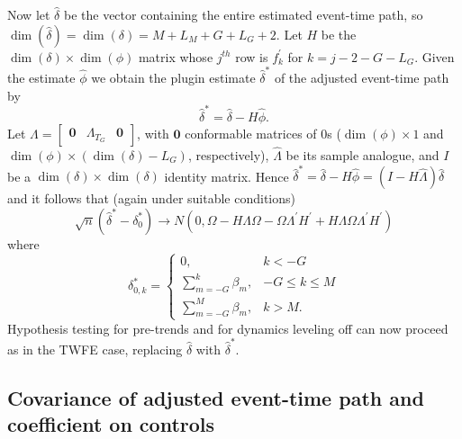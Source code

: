 \documentclass[bib]{./sty/statapress}
\begin{document}
Now let $\hat{\delta}$ be the vector containing the entire estimated
event-time path, so $\dim\left(\hat{\delta}\right)=\dim\left(\delta\right)=M+L_{M}+G+L_{G}+2$.
Let $H$ be the $\dim\left(\delta\right)\times\dim\left(\phi\right)$
matrix whose $j^{th}$ row is $f_{k}^{'}$ for $k=j-2-G-L_{G}$. Given
the estimate $\widehat{\phi}$ we obtain the plugin estimate $\hat{\delta}^{*}$
of the adjusted event-time path by
\[
\hat{\delta}^{*}=\widehat{\delta}-H\hat{\phi}.
\]
Let $\Lambda=\begin{bmatrix}\boldsymbol{0} & \Lambda_{T_G} & \boldsymbol{0}\end{bmatrix}$,
with $\boldsymbol{0}$ conformable matrices of 0s ($\dim\left(\phi\right)\times1$
and $\dim\left(\phi\right)\times\left(\dim\left(\delta\right)-L_{G}\right)$,
respectively), $\widehat{\Lambda}$ be its sample analogue, and $I$
be a $\dim\left(\delta\right)\times\dim\left(\delta\right)$ identity
matrix. Hence $\hat{\delta}^{*}=\widehat{\delta}-H\hat{\phi}=\left(I-H\widehat{\Lambda}\right)\widehat{\delta}$
and it follows that (again under suitable conditions)
\[
\sqrt{n}\left(\widehat{\delta}^{*}-\delta_{0}^{*}\right)\to N\left(0,\Omega-H\Lambda\Omega-\Omega\Lambda^{\prime}H^{\prime}+H\Lambda\Omega\Lambda^{\prime}H^{\prime}\right)
\]
where
\[
\delta_{0,k}^{*}=\begin{cases}
0, & k<-G\\
\sum_{m=-G}^{k}\beta_{m}, & -G\le k\le M\\
\sum_{m=-G}^{M}\beta_{m}, & k>M.
\end{cases}
\]
Hypothesis testing for pre-trends and for dynamics leveling off can
now proceed as in the TWFE case, replacing $\widehat{\delta}$ with
$\hat{\delta}^{*}$.

\subsection{Covariance of adjusted event-time path and coefficient on controls}
\end{document}
